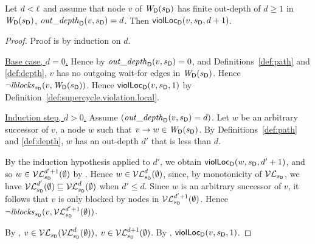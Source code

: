 \begin{proposition} %
\label{prop:finOutDepth-Implies-locScViol}
Let $d < \ell$ and assume that node $v$ of $\mathit{W}_{\mathsf{D}}({s_\mathsf{D}})$ 
has finite out-depth of $d \ge 1$ in $\mathit{W}_{\mathsf{D}}({s_\mathsf{D}})$, \ie $\mathit{out\_depth}_{\mathsf{D}}({v, s_\mathsf{D}}) = d$.
Then $\mathsf{violLoc}_{\mathsf{D}}(v,s_\mathsf{D},d+1)$.
\end{proposition}
%
\begin{proof}
Proof is by induction on $d$. 

\vspace{1.0ex}
\ul{Base case, $d=0$.} 
Hence by $\mathit{out\_depth}_{\mathsf{D}}({v, s_\mathsf{D}}) = 0$, and  Definitions~\ref{def:path} and \ref{def:depth},  
$v$ has no outgoing wait-for edges in $\mathit{W}_{\mathsf{D}}({s_\mathsf{D}})$.
Hence $\neg \mathit{lblocks}_{s_\mathsf{D}}(v, \mathit{W}_{\mathsf{D}}({s_\mathsf{D}}))$. 
 Hence $\mathsf{violLoc}_{\mathsf{D}}(v,s_\mathsf{D},1)$ by Definition~\ref{def:supercycle.violation.local}.

\vspace{1.0ex}
\ul{Induction step, $d > 0$.}
Assume $(\mathit{out\_depth}_{\mathsf{D}}({v, s_\mathsf{D}}) = d)$. 
Let $w$ be an arbitrary successor of $v$, \ie a node $w$ such that $v \rightarrow w \in \mathit{W}_{\mathsf{D}}({s_\mathsf{D}})$.
By Definitions~\ref{def:path} and \ref{def:depth}, $w$ has an out-depth $d'$ that is less than $d$. 

By the induction hypothesis applied to $d'$, we obtain $\mathsf{violLoc}_{\mathsf{D}}(w,s_\mathsf{D},d'+1)$, and so $w \in \mathcal{VL}_{s_\mathsf{D}}^{d'+1}(\emptyset)$ by .
Hence $w \in \mathcal{VL}_{s_\mathsf{D}}^{d}(\emptyset)$, since, by monotonicity of $\mathcal{VL}_{s_\mathsf{D}}$, we have 
$ \mathcal{VL}_{s_\mathsf{D}}^{d'}(\emptyset) \sqsubseteq  \mathcal{VL}_{s_\mathsf{D}}^{d}(\emptyset)$ when $d' \le d$.
Since  $w$ is an arbitrary successor of $v$, it follows that $v$ is only blocked by nodes in $\mathcal{VL}_{s_\mathsf{D}}^{d'+1}(\emptyset)$.
Hence $\neg \mathit{lblocks}_{s_\mathsf{D}}(v, \mathcal{VL}_{s_\mathsf{D}}^{d'+1}(\emptyset))$.

By , $v \in \mathcal{VL}_{s_\mathsf{D}}(\mathcal{VL}_{s_\mathsf{D}}^{d}(\emptyset))$, \ie $v \in  \mathcal{VL}_{s_\mathsf{D}}^{d+1}(\emptyset)$.
By , $\mathsf{violLoc}_{\mathsf{D}}(v,s_\mathsf{D},1)$.


\end{proof}







